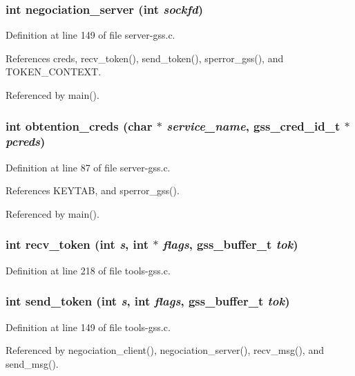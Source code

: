 \subsubsection{\setlength{\rightskip}{0pt plus 5cm}int negociation\_\-server (int {\em sockfd})}\label{server-gss_8c_a34}




Definition at line 149 of file server-gss.c.

References creds, recv\_\-token(), send\_\-token(), sperror\_\-gss(), and TOKEN\_\-CONTEXT.

Referenced by main().
\subsubsection{\setlength{\rightskip}{0pt plus 5cm}int obtention\_\-creds (char $\ast$ {\em service\_\-name}, gss\_\-cred\_\-id\_\-t $\ast$ {\em pcreds})}\label{server-gss_8c_a33}




Definition at line 87 of file server-gss.c.

References KEYTAB, and sperror\_\-gss().

Referenced by main().
\subsubsection{\setlength{\rightskip}{0pt plus 5cm}int recv\_\-token (int {\em s}, int $\ast$ {\em flags}, gss\_\-buffer\_\-t {\em tok})}\label{server-gss_8c_a30}




Definition at line 218 of file tools-gss.c.
\subsubsection{\setlength{\rightskip}{0pt plus 5cm}int send\_\-token (int {\em s}, int {\em flags}, gss\_\-buffer\_\-t {\em tok})}\label{server-gss_8c_a31}




Definition at line 149 of file tools-gss.c.

Referenced by negociation\_\-client(), negociation\_\-server(), recv\_\-msg(), and send\_\-msg().
